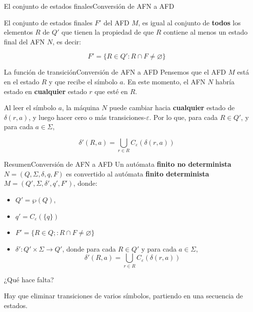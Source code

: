 \documentclass[spanish,handout]{beamer}
\begin{document}
  \begin{frame}{El conjunto de estados finales}{Conversión de AFN a AFD}

    El conjunto de \alert{estados finales} $F'$ del AFD $M$, es igual al conjunto de \textbf{todos} los elementos $R$ de $Q'$ que tienen la propiedad de que $R$ contiene al menos un estado final del AFN $N$, es decir: \pause

    \[F'= \{R \in Q' : R \cap F \neq \varnothing\}\]
      
  \end{frame}

  \begin{frame}{La función de transición}{Conversión de AFN a AFD}
      Pensemos que el AFD $M$ está en el estado $R$ y que recibe el símbolo $a$.
      En este momento, el AFN $N$ habría estado en \textbf{cualquier} estado $r$ que esté en $R$. \pause

      \bigskip

      Al leer el símbolo $a$, la máquina $N$ puede cambiar hacia \textbf{cualquier} estado de $\delta(r,a)$, y luego hacer cero o más transiciones-$\varepsilon$. Por lo que, para cada $R \in Q'$, y para cada $a \in \Sigma$, \pause

      \[ \delta'(R,a) = \bigcup_{r \in R} C_\varepsilon (\delta (r,a)) \]
  \end{frame}

  \begin{frame}{Resumen}{Conversión de AFN a AFD}
      Un autómata \textbf{finito no determinista} $N = (Q, \Sigma, \delta, q, F)$ es convertido al autómata \textbf{finito determinista} $M = (Q', \Sigma, \delta', q', F')$, donde: \pause
      
      \bigskip

      \begin{itemize}
        \itemsep1.5ex
        \item $Q' = \wp(Q)$, \pause
        \item $q'= C_\varepsilon(\{q\})$ \pause
        \item $F' = \{R \in Q; : R \cap F \neq \varnothing\}$ \pause
        \item $\delta' : Q' \times \Sigma \to Q'$, donde para cada $R \in Q'$ y para cada $a \in \Sigma$,
        \[\delta'(R,a) = \bigcup_{r \in R} C_\varepsilon (\delta (r,a))\]
      \end{itemize} \pause

      \bigskip

      ¿Qué hace falta? \pause

      Hay que eliminar transiciones de varios símbolos, partiendo en una secuencia de estados.

  \end{frame}
\end{document}
